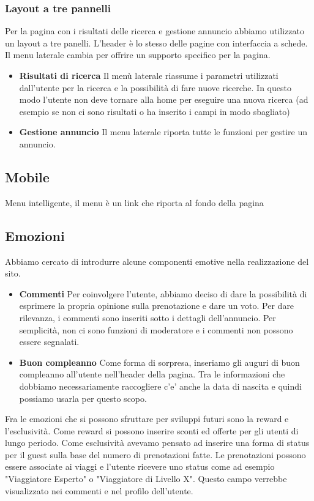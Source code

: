 \documentclass[1_relazione.tex]{subfiles}
\begin{document}
\subsubsection{Layout a tre pannelli} 
Per la pagina con i risultati delle ricerca e gestione annuncio abbiamo utilizzato un layout a tre panelli. L'header è lo stesso delle pagine con interfaccia a schede. Il menu laterale cambia per offrire un supporto specifico per la pagina.

\begin{itemize}
\item \textbf{Risultati di ricerca} Il menù laterale riassume i parametri utilizzati dall'utente per la ricerca e la possibilità di fare nuove ricerche. In questo modo l'utente non deve tornare alla home per eseguire una nuova ricerca (ad esempio se non ci sono risultati o ha inserito i campi in modo sbagliato) 
\item \textbf{Gestione annuncio} Il menu laterale riporta tutte le funzioni per gestire un annuncio. 
\end{itemize}



\subsection{Mobile}
Menu intelligente, il menu è un link che riporta al fondo della pagina 

\subsection{Emozioni}
Abbiamo cercato di introdurre alcune componenti emotive nella realizzazione del sito.

\begin{itemize}
\item \textbf{Commenti} Per coinvolgere l'utente, abbiamo deciso di dare la possibilità di esprimere la propria opinione sulla prenotazione e dare un voto. Per dare rilevanza, i commenti sono inseriti sotto i dettagli dell'annuncio. Per semplicità, non ci sono funzioni di moderatore e i commenti non possono essere segnalati. 

\item \textbf{Buon compleanno} Come forma di sorpresa, inseriamo gli auguri di buon compleanno all'utente nell'header della pagina. Tra le informazioni che dobbiamo necessariamente raccogliere c'e' anche la data di nascita e quindi possiamo usarla per questo scopo.  
\end{itemize}

Fra le emozioni che si possono sfruttare per sviluppi futuri sono la reward e l'esclusività. Come reward si possono inserire sconti ed offerte per gli utenti di lungo periodo. Come esclusività avevamo pensato ad inserire una forma di status per il guest sulla base del numero di prenotazioni fatte. Le prenotazioni possono essere associate ai viaggi e l'utente ricevere uno status come ad esempio "Viaggiatore Esperto" o "Viaggiatore di Livello X". Questo campo verrebbe visualizzato nei commenti e nel profilo dell'utente. 
\end{document}
